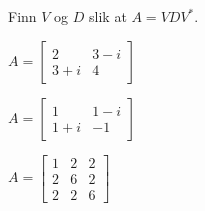 \begin{oppgave}
Finn $V$ og $D$ slik at $A=VDV^*$.
\begin{punkt}
$
A=\begin{bmatrix}
2 & 3-i\\
3+i & 4
\end{bmatrix}
$
\end{punkt}
\begin{punkt}
$
A=\begin{bmatrix}
1 & 1-i\\
1+i & -1
\end{bmatrix}
$
\end{punkt}
\begin{punkt}
$
A=
\begin{bmatrix}
1 & 2 & 2\\
2 & 6 & 2\\
2 & 2 & 6
\end{bmatrix}
$ 
\end{punkt}
\end{oppgave}



